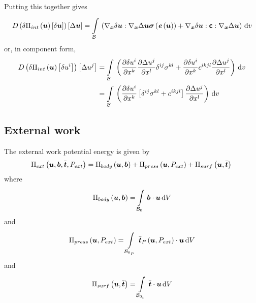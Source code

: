 Putting this together gives
\begin{equation}
  \directionalderiv{}{\variation{\fnof{\Pi_{int}}{\vectr{u}}}{\vectr{u}}}{\linearisationdir{\vectr{u}}}=
  \gint{\embedmanifold{B}}{}{\pbrac{\doubledotprod{\gradient{\vectr{x}}{\variationdir{\vectr{u}}}}{\gradient{\vectr{x}}{\linearisationdir{\vectr{u}}}\fnof{\tensor{\sigma}}{\fnof{\tensor{e}}{\vectr{u}}}}+
            \doubledotprod{\gradient{\vectr{x}}{\variationdir{\vectr{u}}}}{\doubledotprod{\tensorfour{c}}{\gradient{\vectr{x}}{\linearisationdir{\vectr{u}}}}}}}{v}
\end{equation}
or, in component form,
\begin{equation}
  \begin{split}
    \directionalderiv{}{\variation{\fnof{\Pi_{int}}{\vectr{u}}}{u^{i}}}{\linearisationdir{u^{j}}}
    &=\gint{\embedmanifold{B}}{}{\pbrac{\delby{\variationdir{u^{i}}}{x^{k}}\delby{\linearisationdir{u^{j}}}{x^{l}}\contrakronecker{i}{j}\sigma^{kl}+
        \delby{\variationdir{u^{i}}}{x^{k}}c^{ikjl}\delby{\linearisationdir{u^{j}}}{x^{l}}}}{v}\\
    &=\gint{\embedmanifold{B}}{}{\pbrac{\delby{\variationdir{u^{i}}}{x^{k}}\sqbrac{\contrakronecker{i}{j}\sigma^{kl}+c^{ikjl}}\delby{\linearisationdir{u^{j}}}{x^{l}}}}{v}
  \end{split}
\end{equation}

\subsection{External work}

The external work potential energy is given by
\begin{equation}
  \fnof{\Pi_{ext}}{\vectr{u},\vect{b},\bar{\vect{t}},P_{ext}}=\fnof{\Pi_{body}}{\vectr{u},\vectr{b}}+\fnof{\Pi_{press}}{\vectr{u},P_{ext}}+\fnof{\Pi_{surf}}{\vectr{u},\bar{\vectr{t}}}\\
\end{equation}
where
\begin{equation}
  \fnof{\Pi_{body}}{\vectr{u},\vectr{b}}=\gint{\embedmanifold{B}_{0}}{}{\dotprod{\vect{b}}{\vectr{u}}}{V}
\end{equation}
and 
\begin{equation}
  \fnof{\Pi_{press}}{\vectr{u},P_{ext}}=\gint{\embedmanifold{B}_{0_{P}}}{}{\dotprod{\fnof{\bar{\vect{t}}_{P}}{\vectr{u},P_{ext}}}{\vectr{u}}}{V}
\end{equation}
and
\begin{equation}
  \fnof{\Pi_{surf}}{\vectr{u},\bar{\vectr{t}}}=\gint{\embedmanifold{B}_{0_{t}}}{}{\dotprod{\bar{\vect{t}}}{\vectr{u}}}{V}
\end{equation}

